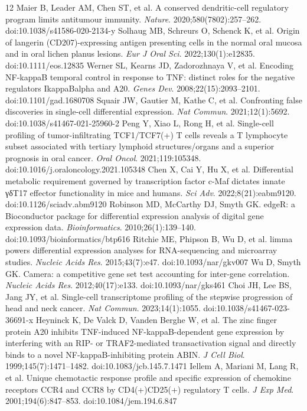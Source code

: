 \documentclass[11pt,a4paper]{article}
\begin{document}
\begin{thebibliography}{12}
 Maier B, Leader AM, Chen ST, et al. A conserved dendritic-cell regulatory program limits antitumour immunity. \textit{Nature}. 2020;580(7802):257–262. doi:10.1038/s41586-020-2134-y
 Solhaug MB, Schreurs O, Schenck K, et al. Origin of langerin (CD207)-expressing antigen presenting cells in the normal oral mucosa and in oral lichen planus lesions. \textit{Eur J Oral Sci}. 2022;130(1):e12835. doi:10.1111/eos.12835
 Werner SL, Kearns JD, Zadorozhnaya V, et al. Encoding NF-kappaB temporal control in response to TNF: distinct roles for the negative regulators IkappaBalpha and A20. \textit{Genes Dev}. 2008;22(15):2093–2101. doi:10.1101/gad.1680708
 Squair JW, Gautier M, Kathe C, et al. Confronting false discoveries in single-cell differential expression. \textit{Nat Commun}. 2021;12(1):5692. doi:10.1038/s41467-021-25960-2
 Peng Y, Xiao L, Rong H, et al. Single-cell profiling of tumor-infiltrating TCF1/TCF7(+) T cells reveals a T lymphocyte subset associated with tertiary lymphoid structures/organs and a superior prognosis in oral cancer. \textit{Oral Oncol}. 2021;119:105348. doi:10.1016/j.oraloncology.2021.105348
 Chen X, Cai Y, Hu X, et al. Differential metabolic requirement governed by transcription factor c-Maf dictates innate γδT17 effector functionality in mice and humans. \textit{Sci Adv}. 2022;8(21):eabm9120. doi:10.1126/sciadv.abm9120
 Robinson MD, McCarthy DJ, Smyth GK. edgeR: a Bioconductor package for differential expression analysis of digital gene expression data. \textit{Bioinformatics}. 2010;26(1):139–140. doi:10.1093/bioinformatics/btp616
 Ritchie ME, Phipson B, Wu D, et al. limma powers differential expression analyses for RNA-sequencing and microarray studies. \textit{Nucleic Acids Res}. 2015;43(7):e47. doi:10.1093/nar/gkv007
 Wu D, Smyth GK. Camera: a competitive gene set test accounting for inter-gene correlation. \textit{Nucleic Acids Res}. 2012;40(17):e133. doi:10.1093/nar/gks461
 Choi JH, Lee BS, Jang JY, et al. Single-cell transcriptome profiling of the stepwise progression of head and neck cancer. \textit{Nat Commun}. 2023;14(1):1055. doi:10.1038/s41467-023-36691-x
 Heyninck K, De Valck D, Vanden Berghe W, et al. The zinc finger protein A20 inhibits TNF-induced NF-kappaB-dependent gene expression by interfering with an RIP- or TRAF2-mediated transactivation signal and directly binds to a novel NF-kappaB-inhibiting protein ABIN. \textit{J Cell Biol}. 1999;145(7):1471–1482. doi:10.1083/jcb.145.7.1471
 Iellem A, Mariani M, Lang R, et al. Unique chemotactic response profile and specific expression of chemokine receptors CCR4 and CCR8 by CD4(+)CD25(+) regulatory T cells. \textit{J Exp Med}. 2001;194(6):847–853. doi:10.1084/jem.194.6.847
\end{thebibliography}
\end{document}
